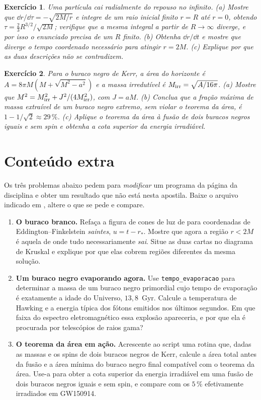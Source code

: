 \documentclass[12pt,a4paper,oneside]{book}
\theoremstyle{rgplain}
\newtheorem{exercise}{Exercício}[chapter]
\theoremstyle{rgremark}
\begin{document}
\begin{exercise}
Uma partícula cai radialmente do repouso no infinito. (a) Mostre que
$\dd r/\dd\tau=-\sqrt{2M/r}$ e integre \emph{de um raio inicial finito}
$r=R$ até $r=0$, obtendo $\tau=\tfrac23R^{3/2}/\sqrt{2M}$; verifique que a
mesma integral a partir de $R\to\infty$ diverge, e por isso o enunciado precisa
de um $R$ finito. (b) Obtenha $\dd r/\dd t$ e mostre que diverge o tempo
coordenado necessário para atingir $r=2M$. (c) Explique por que as duas descrições não se
contradizem.
\end{exercise}

\begin{exercise}
\label{ex:kerr-irredutivel}
Para o buraco negro de Kerr, a área do horizonte é
$A=8\pi M(M+\sqrt{M^2-a^2})$ e a massa irredutível é
$M_{\rm irr}=\sqrt{A/16\pi}$. (a) Mostre que
$M^2=M_{\rm irr}^2+J^2/(4M_{\rm irr}^2)$, com $J=aM$. (b) Conclua que a
fração máxima de massa extraível de um buraco negro extremo, sem violar o
teorema da área, é $1-1/\sqrt2\approx29\,\%$. (c) Aplique o teorema da área à
fusão de dois buracos negros iguais e sem spin e obtenha a cota superior da
energia irradiável.
\end{exercise}


\section{Conteúdo extra}

Os três problemas abaixo pedem para \emph{modificar} um programa da página da disciplina e obter um resultado que não está nesta apostila. Baixe o arquivo indicado em \href{\rgsitecodigos}{\texttt{\rgsitecodigos}}, altere o que se pede e compare.

\begin{enumerate}
  \item \textbf{O buraco branco.} Refaça a figura de cones de luz de
 para coordenadas de
Eddington--Finkelstein \emph{saintes}, $u=t-r_*$. Mostre que agora a região
$r<2M$ é aquela de onde tudo necessariamente \emph{sai}. Situe as duas
cartas no diagrama de Kruskal e explique por que elas cobrem regiões
diferentes da mesma solução.

  \item \textbf{Um buraco negro evaporando agora.} Use \texttt{tempo\_evaporacao}
para determinar a massa de um buraco negro primordial cujo tempo de
evaporação é exatamente a idade do Universo, $13{,}8$~Gyr. Calcule a
temperatura de Hawking e a energia típica dos fótons emitidos nos últimos
segundos. Em que faixa do espectro eletromagnético essa explosão apareceria,
e por que ela é procurada por telescópios de raios gama?

  \item \textbf{O teorema da área em ação.} Acrescente ao script uma rotina que,
dadas as massas e os spins de dois buracos negros de Kerr, calcule a área
total antes da fusão e a área mínima do buraco negro final compatível com o
teorema da área. Use-a para obter a cota superior da energia irradiável em
uma fusão de dois buracos negros iguais e sem spin, e compare com os $5\,\%$
efetivamente irradiados em GW150914.
\end{enumerate}
\end{document}
